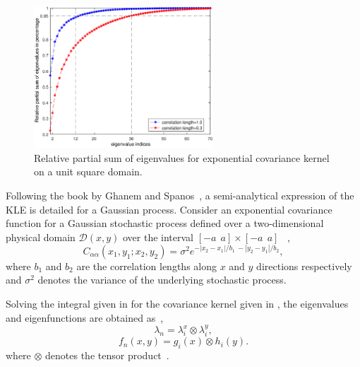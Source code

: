 \documentclass[letter,1p,11pt,oneside,onecolumn,sort&compress]{elsarticle}
\begin{document}
\begin{figure}[htbp]
\centering
 \includegraphics[width=0.6\textwidth,height=0.33\textheight]{plots/RelativeContribution_b1-03.eps}
 \caption{Relative partial sum of eigenvalues for exponential covariance kernel on a unit square domain.}
 \label{fig:eigenContribCompare}
\end{figure}
Following the book by Ghanem and Spanos~\cite{ghanemSFEM1991}, a semi-analytical expression of the KLE is detailed for a Gaussian process.
Consider an exponential covariance function for a Gaussian stochastic process defined over a two-dimensional physical domain $\mathcal{D}(x,y)$ over the interval $[-a \ \ a] \times [-a \ \ a]$ ~\cite{ghanemSFEM1991}, %
\begin{equation}
C_{\alpha\alpha}({x}_1, {y}_1; {x}_2, {y}_2) = {\sigma}^2 e^{- | x_2 - x_1 | / b_1 \ - | y_2 - y_1 | / b_2},
\label{eq:exp2d}
\end{equation}
where $b_1$ and $b_2$ are the correlation lengths along $x$ and $y$ directions respectively and $\sigma^2$ denotes the variance of the underlying stochastic process.

Solving the integral given in  for the covariance kernel given in , the eigenvalues and eigenfunctions are obtained as~\cite{ghanemSFEM1991},
\begin{equation}\label{eq:eigval_2D}
  \lambda_n = \lambda^{x}_i  \otimes \lambda^{y}_i,
\end{equation}
  \begin{equation}
f_n(x, y) = g_i (x) \otimes h_i(y).
\label{eq:eigfn_2D}
\end{equation}
where $\otimes$ denotes the tensor product~\cite{smith2013uncertainty}. %
\end{document}
